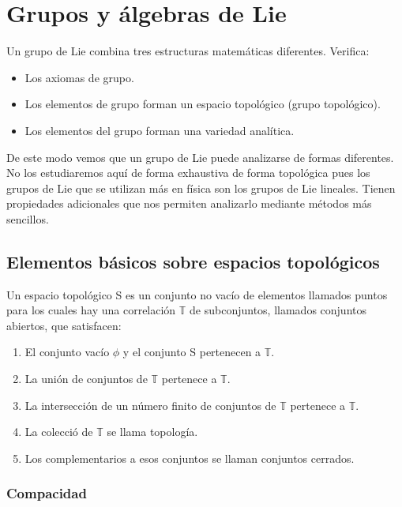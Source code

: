 \documentclass{article}
\begin{document}
\newpage

\section{ Grupos y álgebras de Lie}

Un grupo de Lie combina tres estructuras matemáticas diferentes. Verifica:

\begin{itemize}
    \item Los axiomas de grupo.
    \item Los elementos de grupo forman un espacio topológico (grupo topológico).
    \item Los elementos del grupo forman una variedad analítica.
\end{itemize}

De este modo vemos que un grupo de Lie puede analizarse de formas diferentes. No los estudiaremos aquí de forma exhaustiva de forma topológica pues los grupos de Lie que se utilizan más en física son los grupos de Lie lineales. Tienen propiedades adicionales que nos permiten analizarlo mediante métodos más sencillos.

\subsection{Elementos básicos sobre espacios topológicos}

Un espacio topológico S es un conjunto no vacío de elementos llamados puntos para los cuales hay una correlación $\mathds{T}$ de subconjuntos, llamados conjuntos abiertos, que satisfacen:

\begin{enumerate}
    \item El conjunto vacío $\phi$ y el conjunto S pertenecen a $\mathds{T}$.
    \item La unión de conjuntos de $\mathds{T}$ pertenece a $\mathds{T}$.
    \item La intersección de un número finito de conjuntos de $\mathds{T}$ pertenece a $\mathds{T}$.
    \item La colecció de $\mathds{T}$ se llama topología.
    \item Los complementarios a esos conjuntos se llaman conjuntos cerrados.
\end{enumerate}

\subsubsection{Compacidad}
\end{document}
